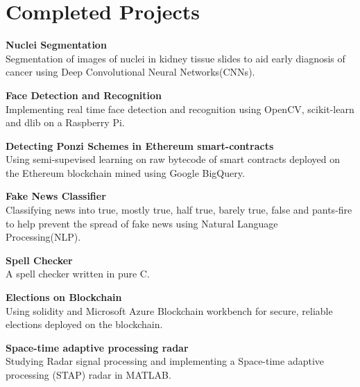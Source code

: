 \documentclass[letterpaper]{article}
\renewenvironment{itemize}{
  \begin{list}{}{
    \setlength{\leftmargin}{1.5em}
  }
}{
  \end{list}
}
\begin{document}
\section*{Completed Projects}
  \begin{itemize}
    \item
    \textbf{Nuclei Segmentation}\\
    Segmentation of images of nuclei in kidney tissue slides to aid early diagnosis of cancer using Deep Convolutional Neural Networks(CNNs).

    \item
    \textbf{Face Detection and Recognition}\\
    Implementing real time face detection and recognition using OpenCV, scikit-learn and dlib on a Raspberry Pi.

    \item
    \textbf{Detecting Ponzi Schemes in Ethereum smart-contracts}\\
    Using semi-supevised learning on raw bytecode of smart contracts deployed on the Ethereum blockchain mined using Google BigQuery.

    \item
    \textbf{Fake News Classifier}\\
    Classifying news into true, mostly true, half true, barely true, false and pants-fire to help prevent the spread of fake news using Natural Language Processing(NLP).

    \item
    \textbf{Spell Checker}\\
    A spell checker written in pure C.

    \item
    \textbf{Elections on Blockchain}\\
    Using solidity and Microsoft Azure Blockchain workbench for secure, reliable elections deployed on the blockchain.
  
    \item 
    \textbf{Space-time adaptive processing radar}\\
    Studying Radar signal processing and implementing a Space-time adaptive processing (STAP) radar in MATLAB.
  \end{itemize}

\end{document}

